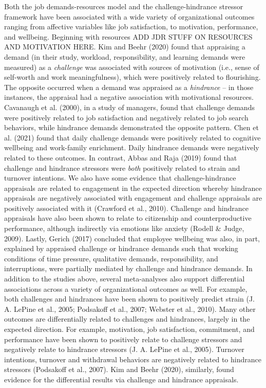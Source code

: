 \documentclass[
  man,mask]{apa7}
\begin{document}
Both the job demands-resources model and the challenge-hindrance stressor framework have been associated with a wide variety of organizational outcomes ranging from affective variables like job satisfaction, to motivation, performance, and wellbeing. Beginning with resources ADD JDR STUFF ON RESOURCES AND MOTIVATION HERE. Kim and Beehr (2020) found that appraising a demand (in their study, workload, responsibility, and learning demands were measured) as a \emph{challenge} was associated with sources of motivation (i.e., sense of self-worth and work meaningfulness), which were positively related to flourishing. The opposite occurred when a demand was appraised as a \emph{hindrance} -- in those instances, the appraisal had a negative association with motivational resources. Cavanaugh et al. (2000), in a study of managers, found that challenge demands were positively related to job satisfaction and negatively related to job search behaviors, while hindrance demands demonstrated the opposite pattern. Chen et al. (2021) found that daily challenge demands were positively related to cognitive wellbeing and work-family enrichment. Daily hindrance demands were negatively related to these outcomes. In contrast, Abbas and Raja (2019) found that challenge and hindrance stressors were \emph{both} positively related to strain and turnover intentions. We also have some evidence that challenge-hindrance appraisals are related to engagement in the expected direction whereby hindrance appraisals are negatively associated with engagement and challenge appraisals are positively associated with it (Crawford et al., 2010). Challenge and hindrance appraisals have also been shown to relate to citizenship and counterproductive performance, although indirectly via emotions like anxiety (Rodell \& Judge, 2009). Lastly, Gerich (2017) concluded that employee wellbeing was also, in part, explained by appraised challenge or hindrance demands such that working conditions of time pressure, qualitative demands, responsibility, and interruptions, were partially mediated by challenge and hindrance demands. In addition to the studies above, several meta-analyses also support differential associations across a variety of organizational outcomes as well. For example, both challenges and hindrances have been shown to positively predict strain (J. A. LePine et al., 2005; Podsakoff et al., 2007; Webster et al., 2010). Many other outcomes are differentially related to challenges and hindrances, largely in the expected direction. For example, motivation, job satisfaction, commitment, and performance have been shown to positively relate to challenge stressors and negatively relate to hindrance stressors (J. A. LePine et al., 2005). Turnover intentions, turnover and withdrawal behaviors are negatively related to hindrance stressors (Podsakoff et al., 2007). Kim and Beehr (2020), similarly, found evidence for the differential results via challenge and hindrance appraisals.
\end{document}
